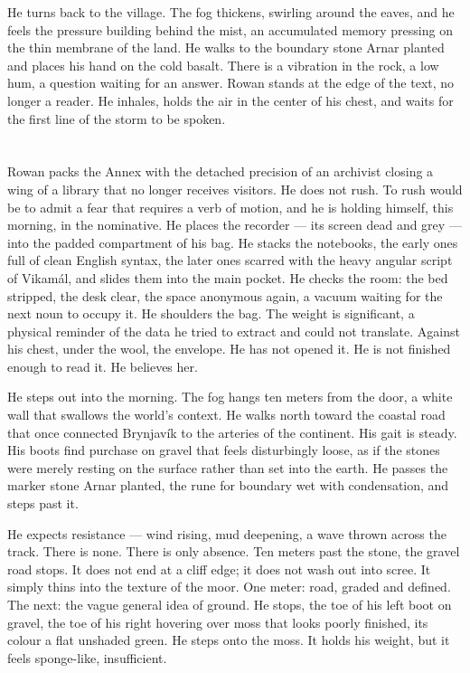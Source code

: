 \documentclass[11pt,oneside]{book}
\begin{document}
He turns back to the village. The fog thickens, swirling around the
eaves, and he feels the pressure building behind the mist, an
accumulated memory pressing on the thin membrane of the land. He walks
to the boundary stone Arnar planted and places his hand on the cold
basalt. There is a vibration in the rock, a low hum, a question waiting
for an answer. Rowan stands at the edge of the text, no longer a reader.
He inhales, holds the air in the center of his chest, and waits for the
first line of the storm to be spoken.

\chapter{}

Rowan packs the Annex with the detached precision of an archivist
closing a wing of a library that no longer receives visitors. He does
not rush. To rush would be to admit a fear that requires a verb of
motion, and he is holding himself, this morning, in the nominative. He
places the recorder --- its screen dead and grey --- into the padded
compartment of his bag. He stacks the notebooks, the early ones full of
clean English syntax, the later ones scarred with the heavy angular
script of Vikamál, and slides them into the main pocket. He checks the
room: the bed stripped, the desk clear, the space anonymous again, a
vacuum waiting for the next noun to occupy it. He shoulders the bag. The
weight is significant, a physical reminder of the data he tried to
extract and could not translate. Against his chest, under the wool, the
envelope. He has not opened it. He is not finished enough to read it. He
believes her.

He steps out into the morning. The fog hangs ten meters from the door, a
white wall that swallows the world's context. He walks north toward the
coastal road that once connected Brynjavík to the arteries of the
continent. His gait is steady. His boots find purchase on gravel that
feels disturbingly loose, as if the stones were merely resting on the
surface rather than set into the earth. He passes the marker stone Arnar
planted, the rune for boundary wet with condensation, and steps past it.

He expects resistance --- wind rising, mud deepening, a wave thrown
across the track. There is none. There is only absence. Ten meters past
the stone, the gravel road stops. It does not end at a cliff edge; it
does not wash out into scree. It simply thins into the texture of the
moor. One meter: road, graded and defined. The next: the vague general
idea of ground. He stops, the toe of his left boot on gravel, the toe of
his right hovering over moss that looks poorly finished, its colour a
flat unshaded green. He steps onto the moss. It holds his weight, but it
feels sponge-like, insufficient.
\end{document}
